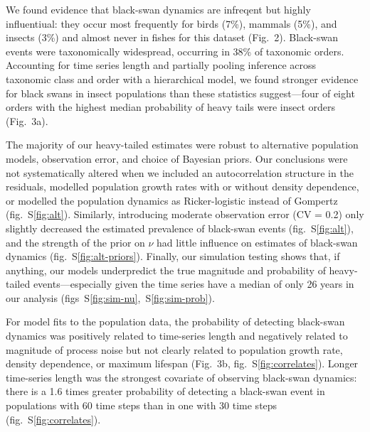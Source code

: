 We found evidence that black-swan dynamics are infreqent but highly influentiual: they occur most frequently for birds (7\%), mammals (5\%), and insects (3\%) and almost never in fishes for this dataset (Fig.~2). Black-swan events were taxonomically widespread, occurring in 38\% of taxonomic orders. Accounting for time series length and partially pooling inference across taxonomic class and order with a hierarchical model, we found stronger evidence for black swans in insect populations than these statistics suggest---four of eight orders with the highest median probability of heavy tails were insect orders (Fig.~3a).

The majority of our heavy-tailed estimates were robust to alternative population models, observation error, and choice of Bayesian priors. Our conclusions were not systematically altered when we included an autocorrelation structure in the residuals, modelled population growth rates with or without density dependence, or modelled the population dynamics as Ricker-logistic instead of Gompertz (fig.~S\ref{fig:alt}). Similarly, introducing moderate observation error (CV = 0.2) only slightly decreased the estimated prevalence of black-swan events (fig.~S\ref{fig:alt}), and the strength of the prior on \(\nu\) had little influence on estimates of black-swan dynamics (fig.~S\ref{fig:alt-priors}). Finally, our simulation testing shows that, if anything, our models underpredict the true magnitude and probability of heavy-tailed events---especially given the time series have a median of only 26 years in our analysis (figs~S\ref{fig:sim-nu},~S\ref{fig:sim-prob}).

For model fits to the population data, the probability of detecting black-swan dynamics was positively related to time-series length and negatively related to magnitude of process noise but not clearly related to population growth rate, density dependence, or maximum lifespan (Fig.~3b, fig.~S\ref{fig:correlates}). Longer time-series length was the strongest covariate of observing black-swan dynamics: there is a 1.6 times greater probability of detecting a black-swan event in populations with 60 time steps than in one with 30 time steps (fig.~S\ref{fig:correlates}).

